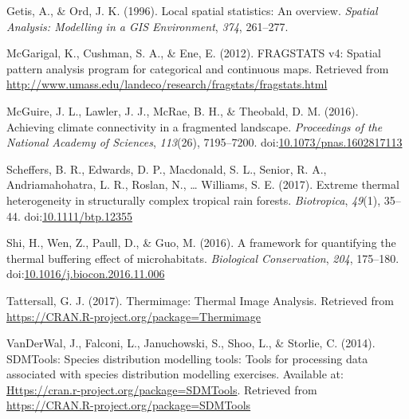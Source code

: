 \documentclass[12pt,british,a4paper,]{article}
\begin{document}
\leavevmode\hypertarget{ref-getis_local_1996}{}%
Getis, A., \& Ord, J. K. (1996). Local spatial statistics: An overview. \emph{Spatial Analysis: Modelling in a GIS Environment}, \emph{374}, 261--277.

\leavevmode\hypertarget{ref-fragstats_2012}{}%
McGarigal, K., Cushman, S. A., \& Ene, E. (2012). FRAGSTATS v4: Spatial pattern analysis program for categorical and continuous maps. Retrieved from \url{http://www.umass.edu/landeco/research/fragstats/fragstats.html}

\leavevmode\hypertarget{ref-mcguire_achieving_2016}{}%
McGuire, J. L., Lawler, J. J., McRae, B. H., \& Theobald, D. M. (2016). Achieving climate connectivity in a fragmented landscape. \emph{Proceedings of the National Academy of Sciences}, \emph{113}(26), 7195--7200. doi:\href{https://doi.org/10.1073/pnas.1602817113}{10.1073/pnas.1602817113}

\leavevmode\hypertarget{ref-scheffers_extreme_2017}{}%
Scheffers, B. R., Edwards, D. P., Macdonald, S. L., Senior, R. A., Andriamahohatra, L. R., Roslan, N., \ldots{} Williams, S. E. (2017). Extreme thermal heterogeneity in structurally complex tropical rain forests. \emph{Biotropica}, \emph{49}(1), 35--44. doi:\href{https://doi.org/10.1111/btp.12355}{10.1111/btp.12355}

\leavevmode\hypertarget{ref-shi_framework_2016}{}%
Shi, H., Wen, Z., Paull, D., \& Guo, M. (2016). A framework for quantifying the thermal buffering effect of microhabitats. \emph{Biological Conservation}, \emph{204}, 175--180. doi:\href{https://doi.org/10.1016/j.biocon.2016.11.006}{10.1016/j.biocon.2016.11.006}

\leavevmode\hypertarget{ref-tattersall_thermimage:_2017}{}%
Tattersall, G. J. (2017). Thermimage: Thermal Image Analysis. Retrieved from \url{https://CRAN.R-project.org/package=Thermimage}

\leavevmode\hypertarget{ref-sdmtools_2014}{}%
VanDerWal, J., Falconi, L., Januchowski, S., Shoo, L., \& Storlie, C. (2014). SDMTools: Species distribution modelling tools: Tools for processing data associated with species distribution modelling exercises. Available at: \href{https://CRAN.R-project.org/package=SDMTools}{Https://cran.r-project.org/package=SDMTools}. Retrieved from \url{https://CRAN.R-project.org/package=SDMTools}
\end{document}
